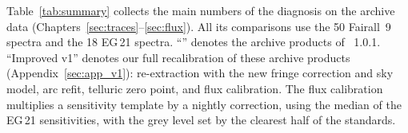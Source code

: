 Table~\ref{tab:summary} collects the main numbers of the diagnosis on the archive data
(Chapters~\ref{sec:traces}--\ref{sec:flux}). All its comparisons use the 50 Fairall~9 spectra and the 18 EG\,21
spectra. ``\banzai{}'' denotes the archive products of \banzai{}~1.0.1. ``Improved v1'' denotes our full
recalibration of these archive products (Appendix~\ref{sec:app_v1}): re-extraction with the new fringe correction and
sky model, arc refit, telluric zero point, and flux calibration. The flux calibration multiplies a sensitivity template
by a nightly correction, using the median of the EG\,21 sensitivities, with the grey level set by the clearest half of
the standards.
